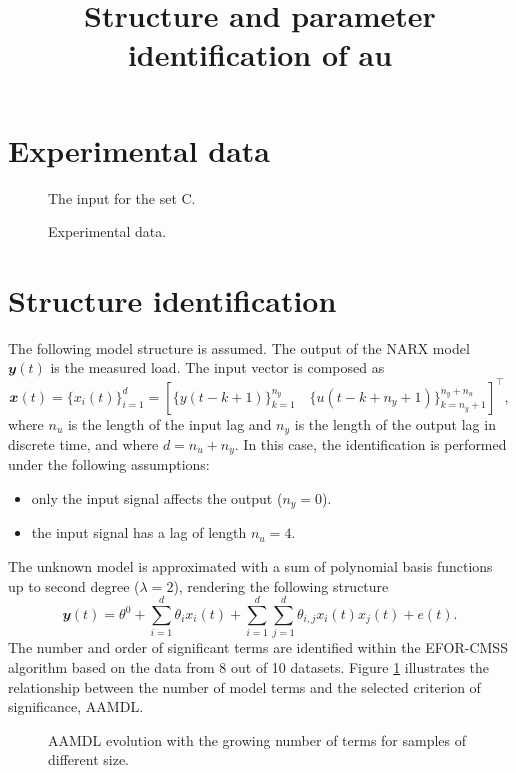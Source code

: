 \documentclass[a4paper,11pt,twoside]{article}
\title{Structure and parameter identification of au}
\theoremstyle{mytheoremstyle}
\begin{document}
	\maketitle
%	
	\section{Experimental data}
		\begin{figure}[!h]
		\centering
		
		\caption{The input for the set C.}
	\end{figure}	
\begin{figure}[!h]
	\centering
	
	\caption{Experimental data.}
\end{figure}
	\section{Structure identification}
	\par The following model structure is assumed. The output of the NARX model $\mathbfit{y}(t)$ is the measured load. The input vector is composed as
	\begin{equation}
	\mathbfit{x}(t) = \{x_i(t)\}^{d}_{i=1} = \left[\{y(t - k + 1)\}^{n_y}_{k=1} \quad \{u(t - k + n_y + 1)\}^{n_y + n_u}_{k= n_y + 1} \right]^{\top},
	\end{equation}
	where $n_u$ is the length of the input lag and $n_y$ is the length of the output lag in discrete time, and where $d = n_u + n_y$. In this case, the identification is performed under the following assumptions:
	\begin{itemize}[noitemsep,topsep=0.3pt,parsep=0.3pt,partopsep=0.2pt,labelindent=1cm] 
		\item only the input signal affects the output ($n_y = 0$).
		\item the input signal has a lag of length $n_u = 4$.
	\end{itemize}
  The unknown model is approximated with a sum of polynomial basis functions up to second degree ($\lambda = 2$), rendering the following structure
	\begin{equation}
	\mathbfit{y}(t) = \theta^0 + \sum_{i=1}^{d} \theta_i x_i(t) + \sum_{i=1}^{d} \sum_{j=1}^{d} \theta_{i,j} x_i(t) x_j(t) + e(t).
	\end{equation}
	The number and order of significant terms are identified within the EFOR-CMSS algorithm based on the data from 8 out of 10 datasets. Figure \ref{fig:aamdl} illustrates the relationship between the number of model terms and the selected criterion of significance, AAMDL.
	\begin{figure}[!h]
		\centering
		\caption{AAMDL evolution with the growing number of terms for samples of different size.}\label{fig:aamdl}
	\end{figure}	
		
\end{document}
